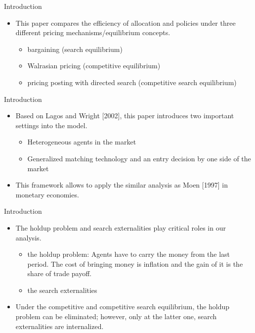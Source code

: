 \documentclass{beamer}
\begin{document}
\begin{frame}{Introduction}
    \begin{itemize}
        \item This paper compares the efficiency of allocation and policies under three different pricing mechanisms/equilibrium concepts.
        \begin{itemize}
            \item bargaining (search equilibrium)
            \item Walrasian pricing (competitive equilibrium)
            \item pricing posting with directed search (competitive search equilibrium)
        \end{itemize}
    \end{itemize}
\end{frame}

\begin{frame}{Introduction}
    \begin{itemize}
        \item Based on Lagos and Wright [2002], this paper introduces two important settings into the model.
        \begin{itemize}
            \item Heterogeneous agents in the market
            \item Generalized matching technology and an entry decision by one side of the  market
        \end{itemize}
        \item This framework allows to apply the similar analysis as Moen [1997] in  monetary economies.
    \end{itemize}
\end{frame}

\begin{frame}{Introduction}
    \begin{itemize}
        \item The holdup problem and search externalities play critical roles in our analysis.
        \begin{itemize}
            \item the holdup problem: Agents have to carry the money from the last period. The cost of bringing money is inflation and the gain of it is the share of trade payoff.
            \item the search externalities
        \end{itemize}
        \item Under the competitive and competitive search equilibrium, the holdup problem can be eliminated; however, only at the  latter one, search externalities are internalized.
    \end{itemize}
\end{frame}
\end{document}
